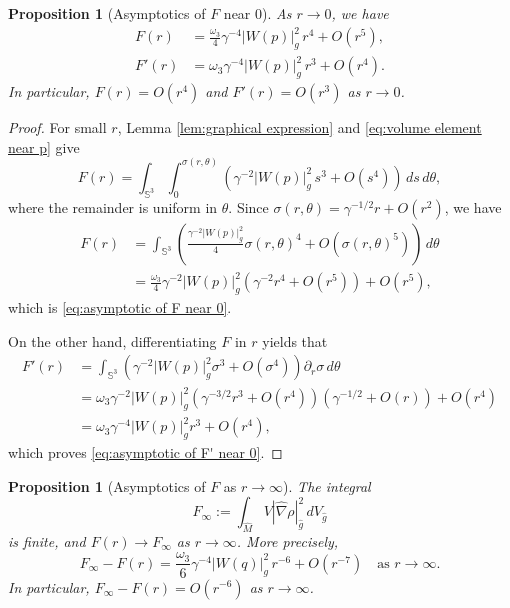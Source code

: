 \documentclass[11pt]{amsart}
\theoremstyle{plain}
\newtheorem{proposition}[theorem]{Proposition}
\numberwithin{equation}{section}
\renewcommand{\S}{\mathbb{S}}
\newcommand{\hn}{\widehat{\nabla}}
\newcommand{\hg}{\widehat{g}}
\newcommand{\hm}{\widehat{M}}
\newcommand{\dv}{\,dV_{\widehat{g}}}
\begin{document}
\begin{proposition}[Asymptotics of $F$ near $0$]\label{prop:asymptotic of F near 0}
As $r\rightarrow0$, we have
\begin{align}
    \label{eq:asymptotic of F near 0}F(r)&=\frac{\omega_3}{4}\gamma^{-4}|W(p)|^2_g\,r^4+O(r^5),\\
    \label{eq:asymptotic of F' near 0}F'(r)&=\omega_3\gamma^{-4}|W(p)|_g^2\,r^3+O(r^4).
\end{align}
In particular, $F(r)=O(r^4)$ and $F'(r)=O(r^3)$ as $r\rightarrow0$.
\end{proposition}

\begin{proof}
For small $r$, Lemma \ref{lem:graphical expression} and \eqref{eq:volume element near p} give
\begin{equation*}
F(r)=\int_{\S^3}\int_0^{\sigma(r,\theta)}\left(\gamma^{-2}|W(p)|^2_g\,s^3+O(s^4)\right)\,ds\,d\theta,
\end{equation*}
where the remainder is uniform in $\theta$. Since $\sigma(r,\theta)=\gamma^{-1/2}r+O(r^2)$, we have
\begin{align*}
F(r)&=\int_{\S^3}\left(\frac{\gamma^{-2}|W(p)|_g^2}{4}\sigma(r,\theta)^4+O(\sigma(r,\theta)^5)\right)\,d\theta\\
&=\frac{\omega_3}{4}\gamma^{-2}|W(p)|^2_g\left(\gamma^{-2}r^4+O(r^5)\right)+O(r^5),
\end{align*}
which is \eqref{eq:asymptotic of F near 0}. 

On the other hand, differentiating $F$ in $r$ yields that
\begin{align*}
F'(r)&=\int_{\S^3}\left(\gamma^{-2}|W(p)|^2_g\sigma^3+O(\sigma^4)\right)\partial_r\sigma \,d\theta\\
&=\omega_3\gamma^{-2}|W(p)|^2_g\left(\gamma^{-3/2}r^3+O(r^4)\right)\left(\gamma^{-1/2}+O(r)\right)+O(r^4)\\
&=\omega_3\gamma^{-4}|W(p)|_g^2r^3+O(r^4),
\end{align*}
which proves \eqref{eq:asymptotic of F' near 0}.
\end{proof}

\begin{proposition}[Asymptotics of $F$ as $r\rightarrow\infty$]\label{prop:asymptotic of F at infinity}
The integral
\begin{equation*}
F_\infty:=\int_{\hm}V|\hn\rho|_{\hg}^2\dv
\end{equation*}
is finite, and $F(r)\rightarrow F_\infty$ as $r\rightarrow\infty$. More precisely,
\begin{equation}
\label{eq:asymptotic of F at infinity}
F_\infty-F(r)=\frac{\omega_3}{6}\gamma^{-4}|W(q)|_g^2\,r^{-6}+O(r^{-7})\quad\text{as } r\rightarrow\infty.
\end{equation}
In particular, $F_\infty-F(r)=O(r^{-6})$ as $r\rightarrow\infty$. 
\end{proposition}
\end{document}
